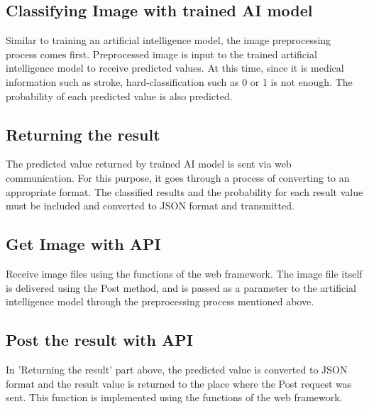 \subsection{\textbf{Classifying Image with trained AI model}}
Similar to training an artificial intelligence model, the image preprocessing process comes first. Preprocessed image is input to the trained artificial intelligence model to receive predicted values. At this time, since it is medical information such as stroke, hard-classification such as 0 or 1 is not enough. The probability of each predicted value is also predicted.\\
\subsection{\textbf{Returning the result}}
The predicted value returned by trained AI model is sent via web communication. For this purpose, it goes through a process of converting to an appropriate format. The classified results and the probability for each result value must be included and converted to JSON format and transmitted.\\
\subsection{\textbf{Get Image with API}}
Receive image files using the functions of the web framework. The image file itself is delivered using the Post method, and is passed as a parameter to the artificial intelligence model through the preprocessing process mentioned above.\\
\subsection{\textbf{Post the result with API}}
In 'Returning the result' part above, the predicted value is converted to JSON format and the result value is returned to the place where the Post request was sent. This function is implemented using the functions of the web framework.\\

